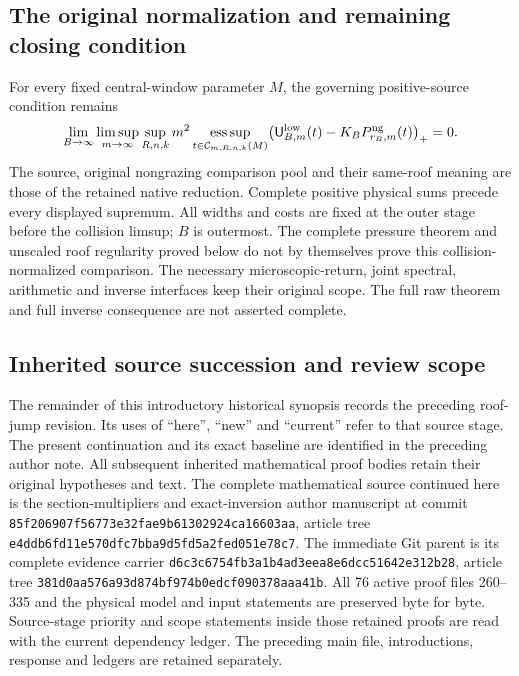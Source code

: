 \documentclass[11pt,reqno]{amsart}
\numberwithin{equation}{section}
\theoremstyle{definition}\newtheorem{definition}[theorem]{Definition}
\theoremstyle{remark}\newtheorem{remark}[theorem]{Remark}
\begin{document}


\subsection*{The original normalization and remaining closing condition}
For every fixed central-window parameter $M$, the governing
positive-source condition remains
\begin{equation}\label{eq:sc-original-obligation}
 \lim_{B\to\infty}\limsup_{m\to\infty}\sup_{R,n,k}
 m^2\operatorname*{ess\,sup}_{t\in\mathcal C_{m,R,n,k}(M)}
 \bigl(\mathsf U^{\rm low}_{B,m}(t)
                    -K_BP^{\rm ng}_{r_B,m}(t)\bigr)_+=0.
\end{equation}
The source, original nongrazing comparison pool and their same-roof
meaning are those of the retained native reduction. Complete positive
physical sums precede every displayed supremum. All widths and costs
are fixed at the outer stage before the collision limsup; $B$ is
outermost. The complete pressure theorem and unscaled roof regularity
proved below do not by themselves prove this collision-normalized
comparison. The necessary microscopic-return, joint spectral,
arithmetic and inverse interfaces keep their original scope. The
full raw theorem and full inverse consequence are not asserted complete.

\subsection*{Inherited source succession and review scope}
The remainder of this introductory historical synopsis records the preceding
roof-jump revision. Its uses of ``here'', ``new'' and ``current'' refer to that
source stage. The present continuation and its exact baseline are identified
in the preceding author note. All subsequent inherited mathematical proof
bodies retain their original hypotheses and text.
The complete mathematical source continued here is the
section-multipliers and exact-inversion author manuscript at commit
\texttt{85f20690\allowbreak{}7f56773e\allowbreak{}32fae9b6\allowbreak{}1302924c\allowbreak{}a16603aa},
article tree
\texttt{e4ddb6fd\allowbreak{}11e570df\allowbreak{}c7bba9d5\allowbreak{}fd5a2fed\allowbreak{}051e78c7}.
The immediate Git parent is its complete evidence carrier
\texttt{d6c3c675\allowbreak{}4fb3a1b4\allowbreak{}ad3eea8e\allowbreak{}6dcc5164\allowbreak{}2e312b28},
article tree
\texttt{381d0aa5\allowbreak{}76a93d87\allowbreak{}4bf974b0\allowbreak{}edcf0903\allowbreak{}78aaa41b}.
All 76 active proof files 260--335 and the physical model and
input statements are preserved byte for byte. Source-stage
priority and scope statements inside those retained proofs are
read with the current dependency ledger. The preceding main
file, introductions, response and ledgers are retained separately.
\end{document}

